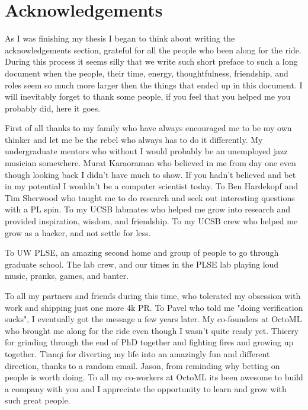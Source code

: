 \section{Acknowledgements}

As I was finishing my thesis I began to think about writing the
    acknowledgements section, grateful for all the people who
    been along for the ride.
During this process it seems silly that we write such short preface to such a long
    document when the people, their time, energy, thoughtfulness, friendship,
    and roles seem so much more larger then the things that ended up in this
    document.
I will inevitably forget to thank some people,
    if you feel that you helped me you probably did, here it goes.

First of all thanks to my family who have always encouraged
    me to be my own thinker and let me be the rebel who
    always has to do it differently.
My undergraduate mentors who without I would probably be an unemployed
    jazz musician somewhere.
Murat Karaoraman who believed in me from day one even though looking
    back I didn't have much to show.
If you hadn't believed and bet in my potential I wouldn't be a computer scientist today.
To Ben Hardekopf and Tim Sherwood who taught me to do research
    and seek out interesting questions with a PL spin.
To my UCSB labmates who helped me grow into research and
    provided inspiration, wisdom, and friendship.
To my UCSB crew who helped me grow as a hacker, and
    not settle for less.

To UW PLSE, an amazing second home and group of people to
    go through graduate school.
The lab crew, and our times in the PLSE lab playing loud
    music, pranks, games, and banter.

To all my partners and friends during this time, who tolerated
    my obsession with work and shipping just one more 4k PR.
To Pavel who told me "doing verification sucks",
    I eventually got the message a few years later.
My co-founders at OctoML who brought me along for the ride
    even though I wasn't quite ready yet.
Thierry for grinding through the end of PhD together and
    fighting fires and growing up together.
Tianqi for diverting my life into an amazingly fun and
    different direction, thanks to a random email.
Jason, from reminding why betting on people is worth doing.
To all my co-workers at OctoML its been awesome to build
    a company with you and I appreciate the opportunity to
    learn and grow with such great people.

